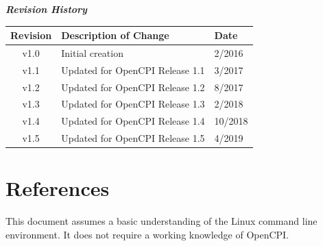         \begin{center}
        \textit{\textbf{Revision History}}
                \begin{table}[H]
                \label{table:revisions} %
                        \begin{tabularx}{\textwidth}{|c|X|l|}
                        \hline
                        \rowcolor{blue}
                        \textbf{Revision} & \textbf{Description of Change} & \textbf{Date} \\
                        \hline
                        v1.0 & Initial creation & 2/2016 \\
                        \hline
                        v1.1 & Updated for OpenCPI Release 1.1 & 3/2017 \\
			            \hline
                        v1.2 & Updated for OpenCPI Release 1.2 & 8/2017 \\
                        \hline
                        v1.3 & Updated for OpenCPI Release 1.3 & 2/2018 \\
                        \hline
                        v1.4 & Updated for OpenCPI Release 1.4 & 10/2018 \\
                        \hline
                        v1.5 & Updated for OpenCPI Release 1.5 & 4/2019 \\
                        \hline
                        \end{tabularx}
                \end{table}
        \end{center}

\newpage
\tableofcontents
\newpage
\listoffigures
\newpage
\listoftables
\newpage
{}
\section{References}

This document assumes a basic understanding of the Linux command line environment. It does not require a working knowledge of OpenCPI.
\def\refskipgs{} %
\def\myreferences{
\hline
Component Development Guide &
\githubio{OpenCPI\_Component\_Development.pdf} \\
\hline
RCC Development Guide &
\githubio{OpenCPI\_RCC\_Development.pdf} \\
\hline
HDL Development Guide &
\githubio{OpenCPI\_HDL\_Development.pdf} \\
}


